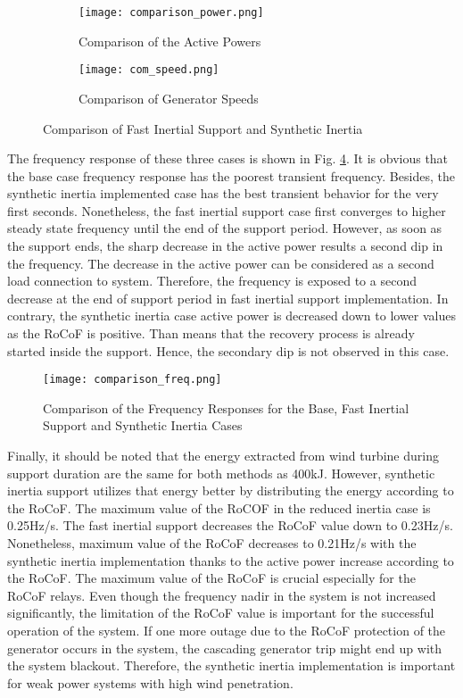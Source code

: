 \begin{figure}[h]
	\centering
	\begin{subfigure}{1\textwidth} %
		\centering
		\texttt{[image: comparison\_power.png]}
		\caption{Comparison of the Active Powers}
		\label{Comp_power}
	\end{subfigure}
	\vspace{0.1em} %
	\begin{subfigure}{1\textwidth} %
		\centering	
		\texttt{[image: com\_speed.png]}
		\caption{Comparison of Generator Speeds}		
		\label{Comp_speed}
	\end{subfigure}
	\caption{Comparison of Fast Inertial Support and Synthetic Inertia}	
\end{figure}
The frequency response of these three cases is shown in Fig. \ref{Comp_freq}. It is obvious that the base case frequency response has the poorest transient frequency. Besides, the synthetic inertia implemented case has the best transient behavior for the very first seconds. Nonetheless, the fast inertial support case first converges to higher steady state frequency until the end of the support period. However, as soon as the support ends, the sharp decrease in the active power results a second dip in the frequency. The decrease in the active power can be considered as a second load connection to system. Therefore, the frequency is exposed to a second decrease at the end of support period in fast inertial support implementation. In contrary, the synthetic inertia case active power is decreased down to lower values as the RoCoF is positive. Than means that the recovery process is already started inside the support. Hence, the secondary dip is not observed in this case. \par
\begin{figure}[h!]
	\centering
	\texttt{[image: comparison\_freq.png]}
	\caption{Comparison of the Frequency Responses for the Base, Fast Inertial Support and Synthetic Inertia Cases}
	\label{Comp_freq}
\end{figure}
\newpage
Finally, it should be noted that the energy extracted from wind turbine during support duration are the same for both methods as 400kJ. However, synthetic inertia support utilizes that energy better by distributing the energy according to the RoCoF. The maximum value of the RoCOF in the reduced inertia case is 0.25Hz/s. The fast inertial support decreases the RoCoF value down to 0.23Hz/s. Nonetheless, maximum value of the RoCoF decreases to 0.21Hz/s with the synthetic inertia implementation thanks to the active power increase according to the RoCoF. The maximum value of the RoCoF is crucial especially for the RoCoF relays. Even though the frequency nadir in the system is not increased significantly, the limitation of the RoCoF value is important for the successful operation of the system. If one more outage due to the RoCoF protection of the generator occurs in the system, the cascading generator trip might end up with the system blackout. Therefore, the synthetic inertia implementation is important for weak power systems with high wind penetration.
